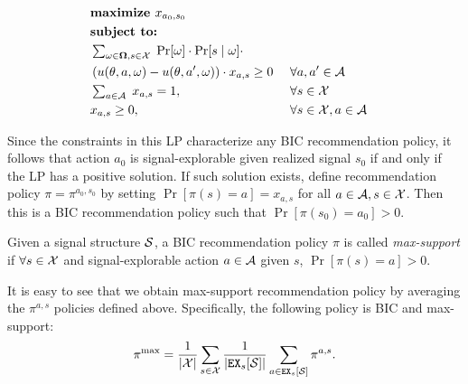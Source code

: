 \begin{figure}[H]
\begin{mdframed}
\vspace{-3mm}
\begin{alignat*}{2}
&\textbf{maximize }    x_{a_0,s_0}\  \\
&\textbf{subject to: }\\
    & \textstyle \sum_{\omega \in \varOmega, s \in \X} \;
    \Pr[\omega] \cdot \Pr[s \mid  \omega] \cdot\\
        &\left(u(\theta, a, \omega) - u(\theta, a', \omega)\right) \cdot x_{a,s} \geq 0   &\ & \forall a,a' \in \A \\
    & \textstyle \sum_{a\in \A}\; x_{a,s} = 1,  \ &\ & \forall s \in \X \\
    & x_{a,s} \geq 0,  \ &\ & \forall s \in \X, a\in \A
\end{alignat*}
\end{mdframed}
\label{fig:public_lp}
\end{figure}

Since the constraints in this LP characterize any BIC recommendation policy, it follows that action $a_0$ is signal-explorable given realized signal $s_0$ if and only if the LP has a positive solution. If such solution exists, define recommendation policy $\pi = \pi^{a_0,s_0}$ by setting
    $\Pr[\pi(s) = a] = x_{a,s}$ for all $a\in \A, s\in \X$.
Then this is a BIC recommendation policy such that
    $\Pr[\pi(s_0) = a_0] > 0$.

\begin{definition}
Given a signal structure $\S$, a BIC recommendation policy $\pi$ is called  \emph{max-support} if $\forall s \in \X$  and signal-explorable action $a\in \A$ given $s$, $\Pr[\pi(s) = a] > 0$.
\end{definition}


It is easy to see that we obtain max-support recommendation policy by averaging the $\pi^{a,s}$ policies defined above. Specifically, the following policy is BIC and max-support:
\begin{align}\label{eq:pimax}
\pi^{\max} = \frac{1}{|\X|} \sum_{s \in \X} \frac{1}{|\EX_s[\S]|} \sum_{a \in \EX_s[\S]} \pi^{a,s}.
\end{align}

%

